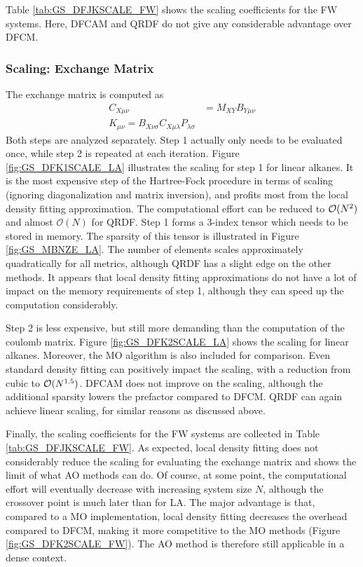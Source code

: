Table \ref{tab:GS_DFJKSCALE_FW} shows the scaling coefficients for the FW systems. Here, DFCAM and QRDF do not give any considerable advantage over DFCM. %

\subsubsection{Scaling: Exchange Matrix}

The exchange matrix is computed as
\begin{align}
C_{X\mu\nu} &= M_{XY} B_{Y\mu\nu} \\
K_{\mu\nu} = B_{X\nu\sigma} C_{X\mu\lambda} P_{\lambda\sigma} 
\end{align}
\noindent Both steps are analyzed separately. Step 1 actually only needs to be evaluated once, while step 2 is repeated at each iteration. Figure \ref{fig:GS_DFK1SCALE_LA} illustrates the scaling for step 1 for linear alkanes. It is the most expensive step of the Hartree-Fock procedure in terms of scaling (ignoring diagonalization and matrix inversion), and profits most from the local density fitting approximation. The computational effort can be reduced to $\mathcal{O}(N^{2})$ and almost $\mathcal{O}(N)$ for QRDF. Step 1 forms a 3-index tensor which needs to be stored in memory. The sparsity of this tensor is illustrated in Figure \ref{fig:GS_MBNZE_LA}. The number of elements scales approximately quadratically for all metrics, although QRDF has a slight edge on the other methods. It appears that local density fitting approximations do not have a lot of impact on the memory requirements of step 1, although they can speed up the computation considerably. 

Step 2 is less expensive, but still more demanding than the computation of the coulomb matrix. Figure \ref{fig:GS_DFK2SCALE_LA} shows the scaling for linear alkanes. Moreover, the MO algorithm is also included for comparison. Even standard density fitting can positively impact the scaling, with a reduction from cubic to $\mathcal{O}(N^{1.5})$. DFCAM does not improve on the scaling, although the additional sparsity lowers the prefactor compared to DFCM. QRDF can again achieve linear scaling, for similar reasons as discussed above. 

Finally, the scaling coefficients for the FW systems are collected in Table \ref{tab:GS_DFJKSCALE_FW}. As expected, local density fitting does not considerably reduce the scaling for evaluating the exchange matrix and shows the limit of what AO methods can do. Of course, at some point, the computational effort will eventually decrease with increasing system size $N$, although the crossover point is much later than for LA. The major advantage is that, compared to a MO implementation, local density fitting decreases the overhead compared to DFCM, making it more competitive to the MO methods (Figure \ref{fig:GS_DFK2SCALE_FW}). The AO method is therefore still applicable in a dense context. 

